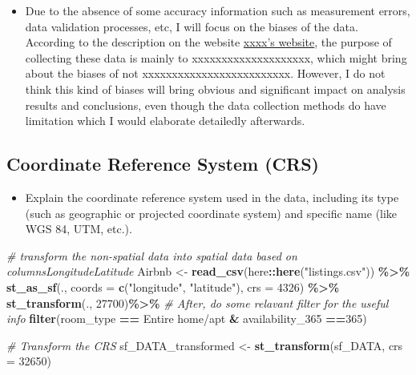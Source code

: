 \documentclass[
]{article}
\newenvironment{Shaded}{\begin{snugshade}}{\end{snugshade}}
\newcommand{\AttributeTok}[1]{\textcolor[rgb]{0.13,0.29,0.53}{#1}}
\newcommand{\CommentTok}[1]{\textcolor[rgb]{0.56,0.35,0.01}{\textit{#1}}}
\newcommand{\DecValTok}[1]{\textcolor[rgb]{0.00,0.00,0.81}{#1}}
\newcommand{\FunctionTok}[1]{\textcolor[rgb]{0.13,0.29,0.53}{\textbf{#1}}}
\newcommand{\NormalTok}[1]{#1}
\newcommand{\OtherTok}[1]{\textcolor[rgb]{0.56,0.35,0.01}{#1}}
\newcommand{\SpecialCharTok}[1]{\textcolor[rgb]{0.81,0.36,0.00}{\textbf{#1}}}
\newcommand{\StringTok}[1]{\textcolor[rgb]{0.31,0.60,0.02}{#1}}
\providecommand{\tightlist}{%
  \setlength{\itemsep}{0pt}\setlength{\parskip}{0pt}}
\begin{document}
\begin{itemize}
\tightlist
\item
  Due to the absence of some accuracy information such as measurement
  errors, data validation processes, etc, I will focus on the biases of
  the data. According to the description on the website
  \href{https://www.openai.com/}{xxxx's website}, the purpose of
  collecting these data is mainly to xxxxxxxxxxxxxxxxxxxx, which might
  bring about the biases of not xxxxxxxxxxxxxxxxxxxxxxxxx. However, I do
  not think this kind of biases will bring obvious and significant
  impact on analysis results and conclusions, even though the data
  collection methods do have limitation which I would elaborate
  detailedly afterwards.
\end{itemize}

\hypertarget{coordinate-reference-system-crs}{%
\subsection{Coordinate Reference System
(CRS)}\label{coordinate-reference-system-crs}}

\begin{itemize}
\tightlist
\item
  Explain the coordinate reference system used in the data, including
  its type (such as geographic or projected coordinate system) and
  specific name (like WGS 84, UTM, etc.).
\end{itemize}

\begin{Shaded}
\begin{Highlighting}[]
\CommentTok{\# transform the non{-}spatial data into spatial data based on columns\textquotesingle{}Longitude\textquotesingle{}\textquotesingle{}Latitude\textquotesingle{}}
\NormalTok{Airbnb }\OtherTok{\textless{}{-}} \FunctionTok{read\_csv}\NormalTok{(here}\SpecialCharTok{::}\FunctionTok{here}\NormalTok{(}\StringTok{"listings.csv"}\NormalTok{)) }\SpecialCharTok{\%\textgreater{}\%}
  \FunctionTok{st\_as\_sf}\NormalTok{(., }\AttributeTok{coords =} \FunctionTok{c}\NormalTok{(}\StringTok{"longitude"}\NormalTok{, }\StringTok{"latitude"}\NormalTok{), }
                   \AttributeTok{crs =} \DecValTok{4326}\NormalTok{) }\SpecialCharTok{\%\textgreater{}\%}
    \FunctionTok{st\_transform}\NormalTok{(., }\DecValTok{27700}\NormalTok{)}\SpecialCharTok{\%\textgreater{}\%}
    \CommentTok{\# After, do some relavant filter for the useful info}
    \FunctionTok{filter}\NormalTok{(room\_type }\SpecialCharTok{==} \StringTok{\textquotesingle{}Entire home/apt\textquotesingle{}} \SpecialCharTok{\&}\NormalTok{ availability\_365 }\SpecialCharTok{==}\StringTok{\textquotesingle{}365\textquotesingle{}}\NormalTok{)}

\CommentTok{\# Transform the CRS}
\NormalTok{sf\_DATA\_transformed }\OtherTok{\textless{}{-}} \FunctionTok{st\_transform}\NormalTok{(sf\_DATA, }\AttributeTok{crs =} \DecValTok{32650}\NormalTok{)}
\end{Highlighting}
\end{Shaded}
\end{document}
